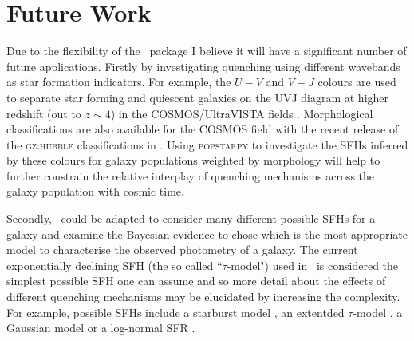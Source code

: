 \section{Future Work}\label{sec:future}

Due to the flexibility of the \starpy\ package I believe it will have a significant number of future applications. Firstly by investigating quenching using different wavebands as star formation indicators. For example, the $U-V$ and $V-J$ colours are used to separate star forming and quiescent galaxies on the UVJ diagram \citep{labbe05, wuyts07, williams09, brammer11, patel12} at higher redshift (out to $z\sim4$) in the COSMOS/UltraVISTA fields \citep[e.g. see work by][]{muzzin13}. Morphological classifications are also available for the COSMOS field with the recent release of the \textsc{gz:hubble} classifications in \cite{willett16}. Using \textsc{popstarpy} to investigate the SFHs inferred by these colours for galaxy populations weighted by morphology will help to further constrain the relative interplay of quenching mechanisms across the galaxy population with cosmic time. 

Secondly, \starpy\ could be adapted to consider many different possible SFHs for a galaxy and examine the Bayesian evidence to chose which is the most appropriate model to characterise the observed photometry of a galaxy. The current exponentially declining SFH (the so called ``$\tau$-model") used in \starpy\ is considered the simplest possible SFH one can assume and so more detail about the effects of different quenching mechanisms may be elucidated by increasing the complexity. For example, possible SFHs include a starburst model \citep{kauffmann03}, an extentded $\tau$-model \citep{simha14}, a Gaussian model \citep{feuillet16} or a log-normal SFR \citep{gladders13, abramson16}. 

